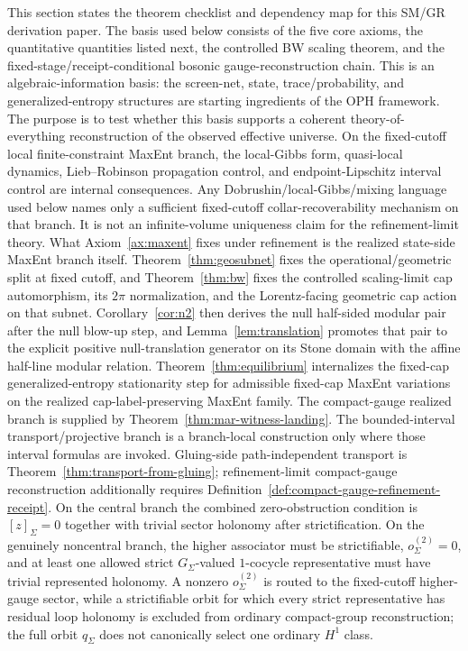 \documentclass[11pt]{article}
\begin{document}
This section states the theorem checklist and dependency map for this SM/GR derivation paper. The basis used below consists of the five core axioms, the quantitative quantities listed next, the controlled BW scaling theorem, and the fixed-stage/receipt-conditional bosonic gauge-reconstruction chain. This is an algebraic-information basis: the screen-net, state, trace/probability, and generalized-entropy structures are starting ingredients of the OPH framework. The purpose is to test whether this basis supports a coherent theory-of-everything reconstruction of the observed effective universe. On the fixed-cutoff local finite-constraint MaxEnt branch, the local-Gibbs form, quasi-local dynamics, Lieb--Robinson propagation control, and endpoint-Lipschitz interval control are internal consequences. Any Dobrushin/local-Gibbs/mixing language used below names only a sufficient fixed-cutoff collar-recoverability mechanism on that branch. It is not an infinite-volume uniqueness claim for the refinement-limit theory. What Axiom~\ref{ax:maxent} fixes under refinement is the realized state-side MaxEnt branch itself. Theorem~\ref{thm:geosubnet} fixes the operational/geometric split at fixed cutoff, and Theorem~\ref{thm:bw} fixes the controlled scaling-limit cap automorphism, its \(2\pi\) normalization, and the Lorentz-facing geometric cap action on that subnet. Corollary~\ref{cor:n2} then derives the null half-sided modular pair after the null blow-up step, and Lemma~\ref{lem:translation} promotes that pair to the explicit positive null-translation generator on its Stone domain with the affine half-line modular relation. Theorem~\ref{thm:equilibrium} internalizes the fixed-cap generalized-entropy stationarity step for admissible fixed-cap MaxEnt variations on the realized cap-label-preserving MaxEnt family. The compact-gauge realized branch is supplied by Theorem~\ref{thm:mar-witness-landing}. The bounded-interval transport/projective branch is a branch-local construction only where those interval formulas are invoked. Gluing-side path-independent transport is Theorem~\ref{thm:transport-from-gluing}; refinement-limit compact-gauge reconstruction additionally requires Definition~\ref{def:compact-gauge-refinement-receipt}. On the central branch the combined zero-obstruction condition is \([z]_\Sigma=0\) together with trivial sector holonomy after strictification. On the genuinely noncentral branch, the higher associator must be strictifiable, \(o^{(2)}_\Sigma=0\), and at least one allowed strict \(G_\Sigma\)-valued \(1\)-cocycle representative must have trivial represented holonomy. A nonzero \(o^{(2)}_\Sigma\) is routed to the fixed-cutoff higher-gauge sector, while a strictifiable orbit for which every strict representative has residual loop holonomy is excluded from ordinary compact-group reconstruction; the full orbit \(q_\Sigma\) does not canonically select one ordinary \(H^1\) class.
\end{document}
